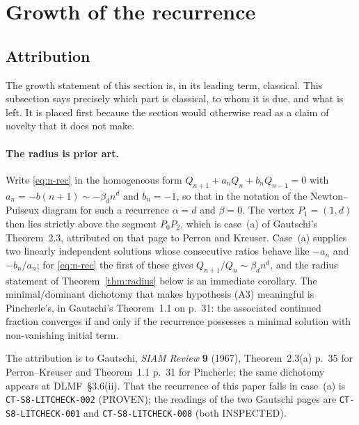 %

\section{Growth of the recurrence}\label{sec:growth}

\subsection{Attribution}\label{ssec:attribution}

The growth statement of this section is, in its leading term, classical. This
subsection says precisely which part is classical, to whom it is due, and what
is left. It is placed first because the section would otherwise read as a claim
of novelty that it does not make.

\paragraph{The radius is prior art.} Write \eqref{eq:n-rec} in the homogeneous
form $Q_{n+1}+a_nQ_n+b_nQ_{n-1}=0$ with $a_n=-b(n+1)\sim-\beta_d n^{d}$ and
$b_n=-1$, so that in the notation of the Newton--Puiseux diagram for such a
recurrence $\alpha=d$ and $\beta=0$. The vertex $P_1=(1,d)$ then lies strictly
above the segment $P_0P_2$, which is case~(a) of Gautschi's Theorem~2.3,
attributed on that page to Perron and Kreuser. Case~(a) supplies two linearly
independent solutions whose consecutive ratios behave like $-a_n$ and
$-b_n/a_n$; for \eqref{eq:n-rec} the first of these gives
$Q_{n+1}/Q_n\sim\beta_d n^{d}$, and the radius statement of
Theorem~\ref{thm:radius} below is an immediate corollary. The minimal/dominant
dichotomy that makes hypothesis (A3) meaningful is Pincherle's, in Gautschi's
Theorem~1.1 on p.~31: the associated continued fraction converges if and only if
the recurrence possesses a minimal solution with non-vanishing initial term.

The attribution is to Gautschi, \emph{SIAM Review} \textbf{9} (1967),
Theorem~2.3(a) p.~35 for Perron--Kreuser and Theorem~1.1 p.~31 for Pincherle;
the same dichotomy appears at DLMF~\S3.6(ii). That the recurrence of this paper
falls in case~(a) is \texttt{CT-S8-LITCHECK-002} (PROVEN); the readings of the
two Gautschi pages are \texttt{CT-S8-LITCHECK-001} and
\texttt{CT-S8-LITCHECK-008} (both INSPECTED).

